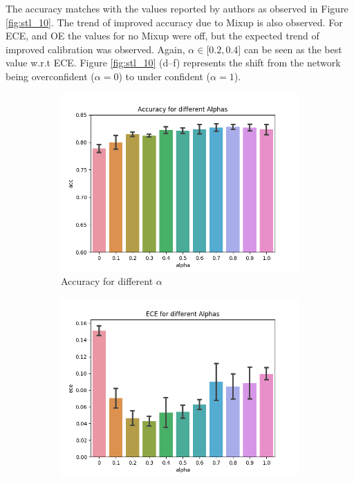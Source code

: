 \documentclass{article}
\begin{document}
The accuracy matches with the values reported by authors as observed in Figure \ref{fig:stl_10}. The trend of improved accuracy due to Mixup is also observed. For ECE, and OE the values for no Mixup were off, but the expected trend of improved calibration was observed. Again, $\alpha \in \lbrack 0.2, 0.4 \rbrack $ can be seen as the best value w.r.t ECE. Figure \ref{fig:stl_10} (d--f) represents the shift from the network being overconfident ($\alpha=0$) to under confident ($\alpha=1$). 

\begin{figure}[h]
     \centering
     \begin{subfigure}[b]{0.31\textwidth}
         \centering
         \includegraphics[width=\textwidth]{images/stl10/accuracyValpha.png}
         \caption{Accuracy for different $\alpha$}
     \end{subfigure}
     \begin{subfigure}[b]{0.31\textwidth}
         \centering
         \includegraphics[width=\textwidth]{images/stl10/eceValpha.png}

\end{subfigure}
\end{figure}
\end{document}
